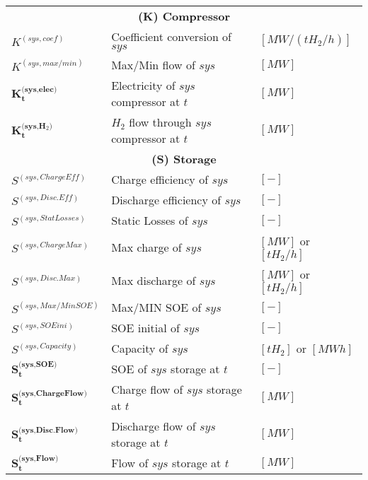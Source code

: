 \begin{table*}
\begin{tabular}{|p{3.5cm}p{6.5cm}p{5cm}|}
    \multicolumn{3}{|c|}{\textbf{(K) Compressor}} \\[0.3cm]
$K^{(sys,coef)}$          & Coefficient conversion of $sys$                            & $[MW/(tH_2/h)]$ \\
    $K^{(sys,max/min)}$       & Max/Min flow of $sys$                                      & $[MW]$ \\[0.3cm]
$\textbf{K}_\textbf{t}^{\textbf{(sys,elec)}}$           & Electricity of $sys$ compressor at $t$       & $[MW]$ \\
    $\textbf{K}_\textbf{t}^{\textbf{(sys,H$_2$)}}$            & $H_2$ flow through $sys$ compressor at $t$   & $[MW]$ \\[0.3cm]
    \multicolumn{3}{|c|}{\textbf{(S) Storage}} \\[0.3cm]
    $S^{(sys,ChargeEff)}$             & Charge efficiency of $sys$                         & $[-]$ \\
    $S^{(sys,Disc.Eff)}$              & Discharge efficiency of $sys$                      & $[-]$ \\
    $S^{(sys,StatLosses)}$            & Static Losses of $sys$                             & $[-]$ \\
    $S^{(sys,ChargeMax)}$             & Max charge of $sys$                                & $ [MW]$ or $ [tH_2/h]$ \\
    $S^{(sys,Disc.Max)}$              & Max discharge of $sys$                             & $ [MW]$ or $ [tH_2/h]$ \\
    $S^{(sys,Max/MinSOE)}$            & Max/MIN SOE of $sys$                               & $[-]$ \\
    $S^{(sys,SOEini)}$                & SOE initial of $sys$                               & $[-]$ \\
    $S^{(sys,Capacity)}$              & Capacity of $sys$                                  & $[tH_2]$ or $[MWh]$ \\[0.3cm]
    $\textbf{S}_\textbf{t}^{\textbf{(sys,SOE)}}$        & SOE of $sys$ storage at $t$                        & $[-]$ \\
    $\textbf{S}_\textbf{t}^{\textbf{(sys,ChargeFlow)}}$ & Charge flow of $sys$ storage at $t$                    & $[MW]$ \\
    $\textbf{S}_\textbf{t}^{\textbf{(sys,Disc.Flow)}}$  & Discharge flow of $sys$ storage at $t$                 & $[MW]$ \\
    $\textbf{S}_\textbf{t}^{\textbf{(sys,Flow)}}$       & Flow of $sys$ storage at $t$                           & $[MW]$ \\

\end{tabular}
\end{table*}
